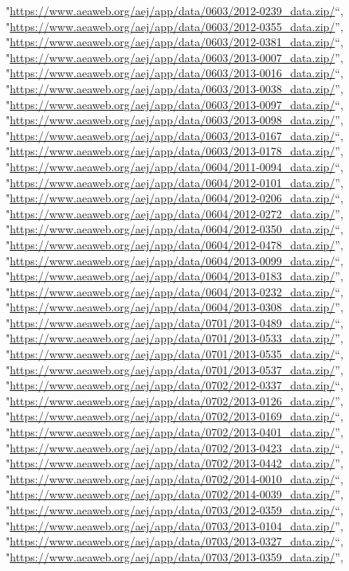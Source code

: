 \documentclass[]{article}
\begin{document}
\begin{itemize}
  "\url{https://www.aeaweb.org/aej/app/data/0603/2012-0239_data.zip/}``,
  "\url{https://www.aeaweb.org/aej/app/data/0603/2012-0355_data.zip/}'',
  "\url{https://www.aeaweb.org/aej/app/data/0603/2012-0381_data.zip/}``,
  "\url{https://www.aeaweb.org/aej/app/data/0603/2013-0007_data.zip/}'',
  "\url{https://www.aeaweb.org/aej/app/data/0603/2013-0016_data.zip/}``,
  "\url{https://www.aeaweb.org/aej/app/data/0603/2013-0038_data.zip/}'',
  "\url{https://www.aeaweb.org/aej/app/data/0603/2013-0097_data.zip/}``,
  "\url{https://www.aeaweb.org/aej/app/data/0603/2013-0098_data.zip/}'',
  "\url{https://www.aeaweb.org/aej/app/data/0603/2013-0167_data.zip/}``,
  "\url{https://www.aeaweb.org/aej/app/data/0603/2013-0178_data.zip/}'',
  "\url{https://www.aeaweb.org/aej/app/data/0604/2011-0094_data.zip/}``,
  "\url{https://www.aeaweb.org/aej/app/data/0604/2012-0101_data.zip/}'',
  "\url{https://www.aeaweb.org/aej/app/data/0604/2012-0206_data.zip/}``,
  "\url{https://www.aeaweb.org/aej/app/data/0604/2012-0272_data.zip/}'',
  "\url{https://www.aeaweb.org/aej/app/data/0604/2012-0350_data.zip/}``,
  "\url{https://www.aeaweb.org/aej/app/data/0604/2012-0478_data.zip/}'',
  "\url{https://www.aeaweb.org/aej/app/data/0604/2013-0099_data.zip/}``,
  "\url{https://www.aeaweb.org/aej/app/data/0604/2013-0183_data.zip/}'',
  "\url{https://www.aeaweb.org/aej/app/data/0604/2013-0232_data.zip/}``,
  "\url{https://www.aeaweb.org/aej/app/data/0604/2013-0308_data.zip/}'',
  "\url{https://www.aeaweb.org/aej/app/data/0701/2013-0489_data.zip/}``,
  "\url{https://www.aeaweb.org/aej/app/data/0701/2013-0533_data.zip/}'',
  "\url{https://www.aeaweb.org/aej/app/data/0701/2013-0535_data.zip/}``,
  "\url{https://www.aeaweb.org/aej/app/data/0701/2013-0537_data.zip/}'',
  "\url{https://www.aeaweb.org/aej/app/data/0702/2012-0337_data.zip/}``,
  "\url{https://www.aeaweb.org/aej/app/data/0702/2013-0126_data.zip/}'',
  "\url{https://www.aeaweb.org/aej/app/data/0702/2013-0169_data.zip/}``,
  "\url{https://www.aeaweb.org/aej/app/data/0702/2013-0401_data.zip/}'',
  "\url{https://www.aeaweb.org/aej/app/data/0702/2013-0423_data.zip/}``,
  "\url{https://www.aeaweb.org/aej/app/data/0702/2013-0442_data.zip/}'',
  "\url{https://www.aeaweb.org/aej/app/data/0702/2014-0010_data.zip/}``,
  "\url{https://www.aeaweb.org/aej/app/data/0702/2014-0039_data.zip/}'',
  "\url{https://www.aeaweb.org/aej/app/data/0703/2012-0359_data.zip/}``,
  "\url{https://www.aeaweb.org/aej/app/data/0703/2013-0104_data.zip/}'',
  "\url{https://www.aeaweb.org/aej/app/data/0703/2013-0327_data.zip/}``,
  "\url{https://www.aeaweb.org/aej/app/data/0703/2013-0359_data.zip/}'',

\end{itemize}
\end{document}
